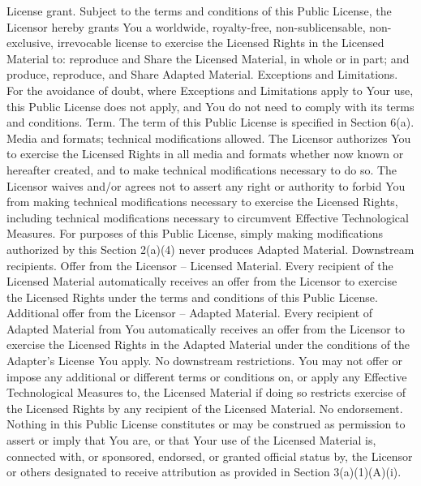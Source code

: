     License grant.
        Subject to the terms and conditions of this Public License, the Licensor hereby grants You a worldwide, royalty-free, non-sublicensable, non-exclusive, irrevocable license to exercise the Licensed Rights in the Licensed Material to:
            reproduce and Share the Licensed Material, in whole or in part; and
            produce, reproduce, and Share Adapted Material.
        Exceptions and Limitations. For the avoidance of doubt, where Exceptions and Limitations apply to Your use, this Public License does not apply, and You do not need to comply with its terms and conditions.
        Term. The term of this Public License is specified in Section 6(a).
        Media and formats; technical modifications allowed. The Licensor authorizes You to exercise the Licensed Rights in all media and formats whether now known or hereafter created, and to make technical modifications necessary to do so. The Licensor waives and/or agrees not to assert any right or authority to forbid You from making technical modifications necessary to exercise the Licensed Rights, including technical modifications necessary to circumvent Effective Technological Measures. For purposes of this Public License, simply making modifications authorized by this Section 2(a)(4) never produces Adapted Material.
        Downstream recipients.
            Offer from the Licensor – Licensed Material. Every recipient of the Licensed Material automatically receives an offer from the Licensor to exercise the Licensed Rights under the terms and conditions of this Public License.
            Additional offer from the Licensor – Adapted Material. Every recipient of Adapted Material from You automatically receives an offer from the Licensor to exercise the Licensed Rights in the Adapted Material under the conditions of the Adapter’s License You apply.
            No downstream restrictions. You may not offer or impose any additional or different terms or conditions on, or apply any Effective Technological Measures to, the Licensed Material if doing so restricts exercise of the Licensed Rights by any recipient of the Licensed Material.
        No endorsement. Nothing in this Public License constitutes or may be construed as permission to assert or imply that You are, or that Your use of the Licensed Material is, connected with, or sponsored, endorsed, or granted official status by, the Licensor or others designated to receive attribution as provided in Section 3(a)(1)(A)(i).

